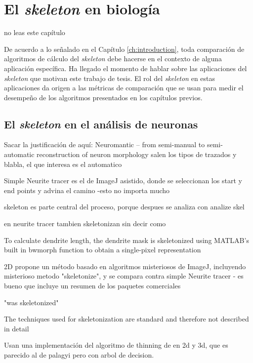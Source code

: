 \chapter{El \textit{skeleton} en biología}
\label{ch:metrics}

no leas este capítulo

De acuerdo a lo señalado en el Capítulo \ref{ch:introduction}, toda comparación de algoritmos de cálculo del \textit{skeleton} debe hacerse en el contexto de alguna aplicación específica. Ha llegado el momento de hablar sobre las aplicaciones del \textit{skeleton} que motivan este trabajo de tesis. El rol del \textit{skeleton} en estas aplicaciones da origen a las métricas de comparación que se usan para medir el desempeño de los algoritmos presentados en los capítulos previos.

\section{El \textit{skeleton} en el análisis de neuronas}

Sacar la justificación de aquí:
Neuromantic – from semi-manual to semi-automatic reconstruction of neuron morphology
salen los tipos de trazados y blabla, el que interesa es el automatico

Simple Neurite tracer \cite{longair2011simple} es el de ImageJ asistido, donde se seleccionan los start y end points y advina el camino -esto no importa mucho

skeleton es parte central del proceso, porque despues se analiza con analize skel


en neurite tracer tambien skeletonizan sin decir como



\cite{schmitz2011automated} To calculate dendrite length, the dendrite mask is skeletonized
using MATLAB’s built in bwmorph function to obtain a single-pixel
representation


\cite{ho2011neurphologyj} 2D propone un método basado en algoritmos misteriosos de ImageJ, incluyendo misterioso metodo "skeletonize", y se compara contra simple Neurite tracer - es bueno que incluye un resumen de los paquetes comerciales

\cite{pani2014morphoneuronet} "was skeletonized"

\cite{billeci2013neuronmorphological} The techniques used for skeletonization are standard and therefore not described in detail



Usan una implementación del algoritmo de thinning de \cite{lee1994building} en 2d y 3d, que es parecido al de palagyi pero con arbol de decision.

